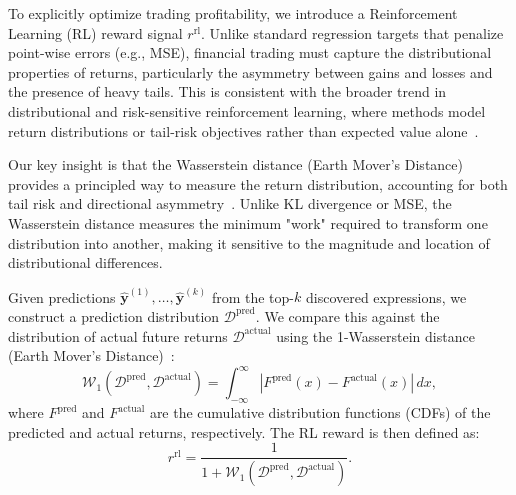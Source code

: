 To explicitly optimize trading profitability, we introduce a Reinforcement Learning (RL) reward signal $r^{\text{rl}}$. Unlike standard regression targets that penalize point-wise errors (e.g., MSE), financial trading must capture the distributional properties of returns, particularly the asymmetry between gains and losses and the presence of heavy tails. This is consistent with the broader trend in distributional and risk-sensitive reinforcement learning, where methods model return distributions or tail-risk objectives rather than expected value alone~\cite{bellemare2017distributional,chow2015cvar}.

Our key insight is that the Wasserstein distance (Earth Mover's Distance) provides a principled way to measure the return distribution, accounting for both tail risk and directional asymmetry~\cite{villani2009optimal,peyre2019computational}. Unlike KL divergence or MSE, the Wasserstein distance measures the minimum "work" required to transform one distribution into another, making it sensitive to the magnitude and location of distributional differences.

Given predictions $\hat{\mathbf{y}}^{(1)}, \ldots, \hat{\mathbf{y}}^{(k)}$ from the top-$k$ discovered expressions, we construct a prediction distribution $\mathcal{D}^{\text{pred}}$. We compare this against the distribution of actual future returns $\mathcal{D}^{\text{actual}}$ using the 1-Wasserstein distance (Earth Mover's Distance)~\cite{villani2009optimal,peyre2019computational}:
\begin{equation}
\mathcal{W}_{1}(\mathcal{D}^{\text{pred}}, \mathcal{D}^{\text{actual}}) = \int_{-\infty}^{\infty} |F^{\text{pred}}(x) - F^{\text{actual}}(x)| \, dx,
\label{eq:wasserstein}
\end{equation}
where $F^{\text{pred}}$ and $F^{\text{actual}}$ are the cumulative distribution functions (CDFs) of the predicted and actual returns, respectively. The RL reward is then defined as:
\begin{equation}
r^{\text{rl}} = \frac{1}{1 + \mathcal{W}_{1}(\mathcal{D}^{\text{pred}}, \mathcal{D}^{\text{actual}})}.
\label{eq:rlreward}
\end{equation}

